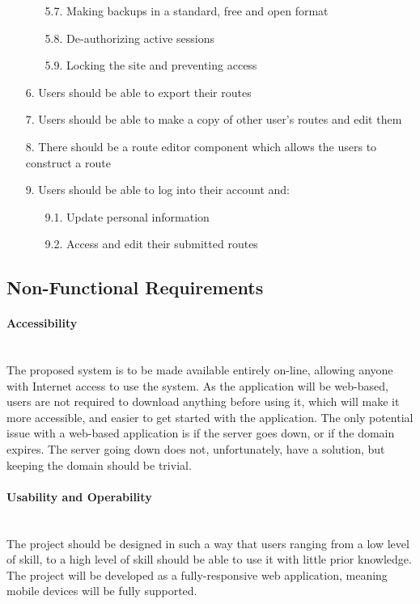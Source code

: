 \begin{enumerate}
\begin{enumerate}
 		\item[5.7.] Making backups in a standard, free and open format
 		\item[5.8.] De-authorizing active sessions
 		\item[5.9.] Locking the site and preventing access
 	\end{enumerate}
 \item[6.] Users should be able to export their routes
 \item[7.] Users should be able to make a copy of other user's routes and edit them
 \item[8.] There should be a route editor component which allows the users to construct a route
 \item[9.] Users should be able to log into their account and:
	 \begin{enumerate}
	 	\item[9.1.] Update personal information
	  	\item[9.2.] Access and edit their submitted routes
	 \end{enumerate}
 \end{enumerate}
 
\subsection{Non-Functional Requirements}
\paragraph{Accessibility}\ \\
The proposed system is to be made available entirely on-line, allowing anyone with Internet access to use the system. As the application will be web-based, users are not required to download anything before using it, which will make it more accessible, and easier to get started with the application. The only potential issue with a web-based application is if the server goes down, or if the domain expires. The server going down does not, unfortunately, have a solution, but keeping the domain should be trivial.

\paragraph{Usability and Operability}\ \\
The project should be designed in such a way that users ranging from a low level of skill, to a high level of skill should be able to use it with little prior knowledge. The project will be developed as a fully-responsive web application, meaning mobile devices will be fully supported.

